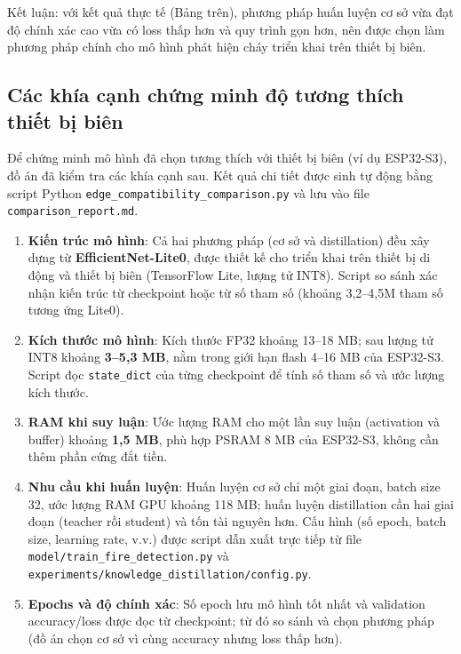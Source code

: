 \documentclass[12pt,a4paper]{report}
\begin{document}
Kết luận: với kết quả thực tế (Bảng trên), phương pháp huấn luyện cơ sở vừa đạt độ chính xác cao vừa có loss thấp hơn và quy trình gọn hơn, nên được chọn làm phương pháp chính cho mô hình phát hiện cháy triển khai trên thiết bị biên.

\subsection{Các khía cạnh chứng minh độ tương thích thiết bị biên}

Để chứng minh mô hình đã chọn tương thích với thiết bị biên (ví dụ ESP32-S3), đồ án đã kiểm tra các khía cạnh sau. Kết quả chi tiết được sinh tự động bằng script Python \texttt{edge\_compatibility\_comparison.py} và lưu vào file \texttt{comparison\_report.md}.

\begin{enumerate}
  \item \textbf{Kiến trúc mô hình}: Cả hai phương pháp (cơ sở và distillation) đều xây dựng từ \textbf{EfficientNet-Lite0}, được thiết kế cho triển khai trên thiết bị di động và thiết bị biên (TensorFlow Lite, lượng tử INT8). Script so sánh xác nhận kiến trúc từ checkpoint hoặc từ số tham số (khoảng 3{,}2--4{,}5M tham số tương ứng Lite0).
  \item \textbf{Kích thước mô hình}: Kích thước FP32 khoảng 13--18 MB; sau lượng tử INT8 khoảng \textbf{3--5{,}3 MB}, nằm trong giới hạn flash 4--16 MB của ESP32-S3. Script đọc \texttt{state\_dict} của từng checkpoint để tính số tham số và ước lượng kích thước.
  \item \textbf{RAM khi suy luận}: Ước lượng RAM cho một lần suy luận (activation và buffer) khoảng \textbf{1{,}5 MB}, phù hợp PSRAM 8 MB của ESP32-S3, không cần thêm phần cứng đắt tiền.
  \item \textbf{Nhu cầu khi huấn luyện}: Huấn luyện cơ sở chỉ một giai đoạn, batch size 32, ước lượng RAM GPU khoảng 118 MB; huấn luyện distillation cần hai giai đoạn (teacher rồi student) và tốn tài nguyên hơn. Cấu hình (số epoch, batch size, learning rate, v.v.) được script dẫn xuất trực tiếp từ file \texttt{model/train\_fire\_detection.py} và \texttt{experiments/knowledge\_distillation/config.py}.
  \item \textbf{Epochs và độ chính xác}: Số epoch lưu mô hình tốt nhất và validation accuracy/loss được đọc từ checkpoint; từ đó so sánh và chọn phương pháp (đồ án chọn cơ sở vì cùng accuracy nhưng loss thấp hơn).
\end{enumerate}
\end{document}
